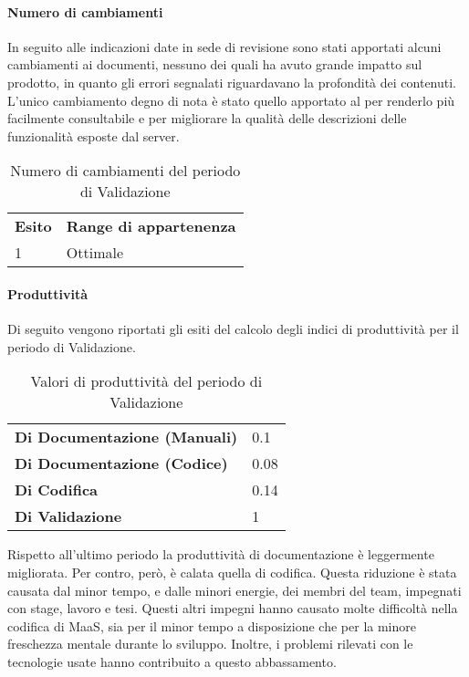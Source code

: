 \paragraph*{Numero di cambiamenti} 
In seguito alle indicazioni date in sede di revisione sono stati apportati alcuni cambiamenti ai documenti, nessuno dei quali ha avuto grande impatto sul prodotto, in quanto gli errori segnalati riguardavano la profondità dei contenuti. L'unico cambiamento degno di nota è stato quello apportato al \ManualeSviluppatore{} per renderlo più facilmente consultabile e per migliorare la qualità delle descrizioni delle funzionalità esposte dal server.  \\
\begin{table}[H]
\centering
\begin{tabular}{|l|l|}
\cline{1-2}
\textbf{Esito}  & \textbf{Range di appartenenza}  \\ \cline{1-2}
1 & Ottimale \\ \cline{1-2}
\end{tabular}
\caption{Numero di cambiamenti del periodo di Validazione}
\end{table}

\paragraph*{Produttività}
Di seguito vengono riportati gli esiti del calcolo degli indici di produttività per il periodo di Validazione.
\begin{table}[H]
\centering
\begin{tabular}{|l|l|}
\cline{1-2}
\textbf{Di Documentazione (Manuali)} & 0.1 \\ \cline{1-2} %
\textbf{Di Documentazione (Codice)} & 0.08 \\ \cline{1-2} %
\textbf{Di Codifica} & 0.14 \\ \cline{1-2} %
\textbf{Di Validazione} & 1 \\ \cline{1-2} %
\end{tabular}
\caption{Valori di produttività del periodo di Validazione}
\end{table}
Rispetto all'ultimo periodo la produttività di documentazione è leggermente migliorata. Per contro, però, è calata quella di codifica. Questa riduzione è stata causata dal minor tempo, e dalle minori energie, dei membri del team, impegnati con stage, lavoro e tesi. Questi altri impegni hanno causato molte difficoltà nella codifica di MaaS, sia per il minor tempo a disposizione che per la minore freschezza mentale durante lo sviluppo. Inoltre, i problemi rilevati con le tecnologie usate hanno contribuito a questo abbassamento.
